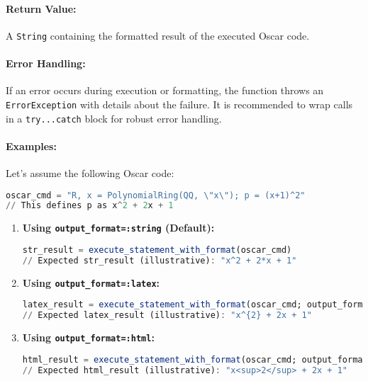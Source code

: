 \documentclass[11pt,a4paper]{article}
\newcommand{\code}[1]{\texttt{#1}}
\providecommand{\code}[1]{\texttt{\color{blue!70!black}#1}}
\begin{document}
\paragraph{Return Value:}
A \code{String} containing the formatted result of the executed Oscar code.

\paragraph{Error Handling:}
If an error occurs during execution or formatting, the function throws an \code{ErrorException} with details about the failure. It is recommended to wrap calls in a \code{try...catch} block for robust error handling.

\paragraph{Examples:}
Let's assume the following Oscar code:
\begin{lstlisting}[language=Julia, basicstyle=\footnotesize\ttfamily\color{black}]
oscar_cmd = "R, x = PolynomialRing(QQ, \"x\"); p = (x+1)^2"
// This defines p as x^2 + 2x + 1
\end{lstlisting}

\begin{enumerate}
    \item \textbf{Using \code{output\_format=:string} (Default):}
    \begin{lstlisting}[language=Julia]
str_result = execute_statement_with_format(oscar_cmd)
// Expected str_result (illustrative): "x^2 + 2*x + 1"
    \end{lstlisting}

    \item \textbf{Using \code{output\_format=:latex}:}
    \begin{lstlisting}[language=Julia]
latex_result = execute_statement_with_format(oscar_cmd; output_format=:latex)
// Expected latex_result (illustrative): "x^{2} + 2x + 1"
    \end{lstlisting}

    \item \textbf{Using \code{output\_format=:html}:}
    \begin{lstlisting}[language=Julia]
html_result = execute_statement_with_format(oscar_cmd; output_format=:html)
// Expected html_result (illustrative): "x<sup>2</sup> + 2x + 1"
    \end{lstlisting}
\end{enumerate}
\end{document}
